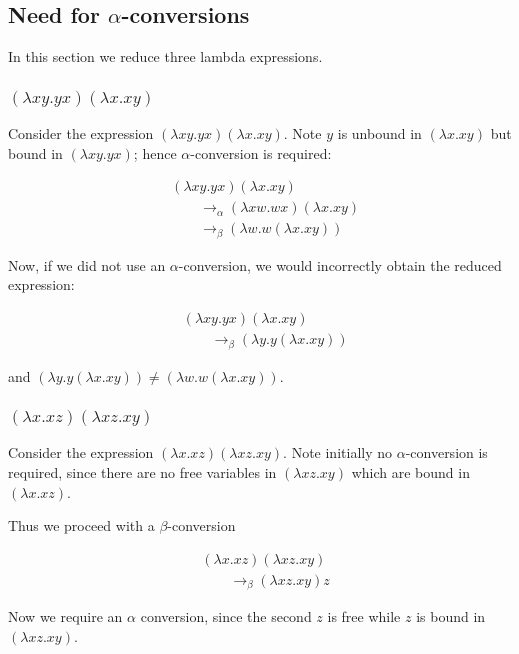 \documentclass[paper=a4, fontsize=11pt]{scrartcl} %
\numberwithin{equation}{section} %
\numberwithin{figure}{section} %
\numberwithin{table}{section} %
\begin{document}
\subsection{Need for $\alpha$-conversions}

In this section we reduce three lambda expressions.

\subsubsection{$(\lambda xy.yx)(\lambda x.xy)$}

Consider the expression $(\lambda xy.yx)(\lambda x.xy)$. Note $y$ is unbound in $(\lambda x.xy)$ but bound in $(\lambda xy.yx)$; hence $\alpha$-conversion is required:

\begin{align*}
& (\lambda xy.yx)(\lambda x.xy) \\
& \qquad{} \rightarrow_\alpha  (\lambda xw.wx)(\lambda x.xy) \\
& \qquad{} \rightarrow_\beta  (\lambda w. w (\lambda x.xy))
\end{align*}

Now, if we did not use an $\alpha$-conversion, we would incorrectly obtain the reduced expression:

\begin{align*}
& (\lambda xy.yx)(\lambda x.xy) \\
& \qquad{} \rightarrow_\beta  (\lambda y. y (\lambda x.xy))
\end{align*}

and $(\lambda y. y (\lambda x.xy)) \ne  (\lambda w. w (\lambda x.xy))$.


\subsubsection{$(\lambda x.xz)(\lambda xz.xy)$}

Consider the expression $(\lambda x.xz)(\lambda xz.xy)$. Note initially no $\alpha$-conversion is required, since there are no free variables in $(\lambda xz.xy)$ which are bound in $(\lambda x.xz)$.

Thus we proceed with a $\beta$-conversion

\begin{align*}
& (\lambda x.xz)(\lambda xz.xy) \\
& \qquad{} \rightarrow_\beta  (\lambda xz.xy) z
\end{align*}

Now we require an $\alpha$ conversion, since the second $z$ is free while $z$ is bound in $(\lambda xz.xy)$. 
\end{document}
